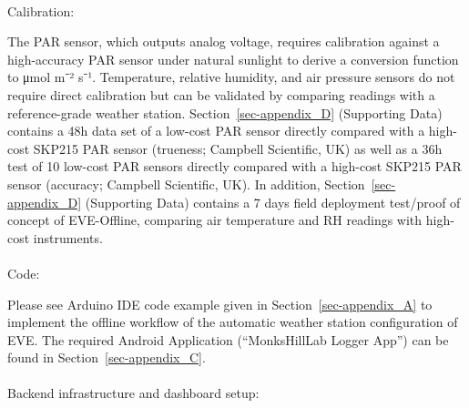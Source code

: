 \documentclass[
  11pt,
  letterpaper,
]{book}
\makeatletter
\let\oldparagraph\paragraph
\renewcommand{\paragraph}{
    \@ifstar
      \xxxParagraphStar
      \xxxParagraphNoStar
  }
\newcommand{\xxxParagraphStar}[1]{\oldparagraph*{#1}\mbox{}}
\newcommand{\xxxParagraphNoStar}[1]{\oldparagraph{#1}\mbox{}}
\makeatother
\begin{document}
\paragraph{Calibration:}\label{sec-eve-offline-calibration}

The PAR sensor, which outputs analog voltage, requires calibration
against a high-accuracy PAR sensor under natural sunlight to derive a
conversion function to μmol m⁻² s⁻¹. Temperature, relative humidity, and
air pressure sensors do not require direct calibration but can be
validated by comparing readings with a reference-grade weather station.
Section~\ref{sec-appendix_D} (Supporting Data) contains a 48h data set
of a low-cost PAR sensor directly compared with a high-cost SKP215 PAR
sensor (trueness; Campbell Scientific, UK) as well as a 36h test of 10
low-cost PAR sensors directly compared with a high-cost SKP215 PAR
sensor (accuracy; Campbell Scientific, UK). In addition,
Section~\ref{sec-appendix_D} (Supporting Data) contains a 7 days field
deployment test/proof of concept of EVE-Offline, comparing air
temperature and RH readings with high-cost instruments.

\paragraph{Code:}\label{sec-eve-offline-code}

Please see Arduino IDE code example given in
Section~\ref{sec-appendix_A} to implement the offline workflow of the
automatic weather station configuration of EVE. The required Android
Application (``MonksHillLab Logger App'') can be found in
Section~\ref{sec-appendix_C}.

\paragraph{Backend infrastructure and dashboard
setup:}\label{sec-eve-offline-backend}
\end{document}
